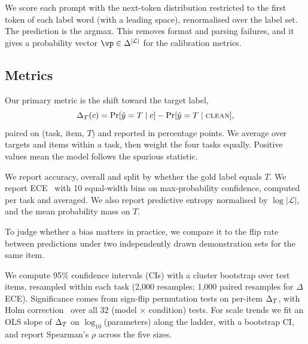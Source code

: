We score each prompt with the next-token distribution restricted to the first token of each label word (with a leading space), renormalised over the label set. The prediction is the argmax. This removes format and parsing failures, and it gives a probability vector $\vp\in\Delta^{|\mathcal{L}|}$ for the calibration metrics.

\subsection{Metrics}
 Our primary metric is the shift toward the target label,
\begin{equation}
    \Delta_T(c) = \Pr[\hat y = T \mid c] - \Pr[\hat y = T \mid \textsc{clean}],
\end{equation}
paired on (task, item, $T$) and reported in percentage points. We average over targets and items within a task, then weight the four tasks equally. Positive values mean the model follows the spurious statistic.

 We report accuracy, overall and split by whether the gold label equals $T$. We report ECE~\citep{guo2017calibration} with 10 equal-width bins on max-probability confidence, computed per task and averaged. We also report predictive entropy normalised by $\log|\mathcal{L}|$, and the mean probability mass on $T$.

 To judge whether a bias matters in practice, we compare it to the flip rate between predictions under two independently drawn \clean demonstration sets for the same item.

 We compute 95\% confidence intervals (CIs) with a cluster bootstrap over test items, resampled within each task (2,000 resamples; 1,000 paired resamples for $\Delta$ECE). Significance comes from sign-flip permutation tests on per-item $\Delta_T$, with Holm correction~\citep{holm1979simple} over all 32 (model $\times$ condition) tests. For scale trends we fit an OLS slope of $\Delta_T$ on $\log_{10}$(parameters) along the \qwen ladder, with a bootstrap CI, and report Spearman's $\rho$ across the five sizes.
